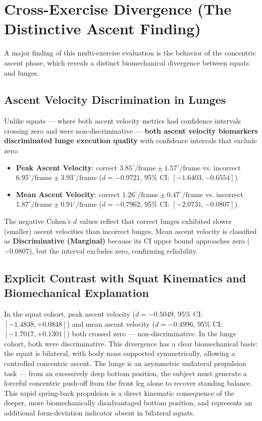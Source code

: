 \section{Cross-Exercise Divergence (The Distinctive Ascent Finding)}
\label{sec:5-3-cross-exercise-divergence-the-distinctive-ascent-finding}


A major finding of this multi-exercise evaluation is the behavior of the concentric ascent phase, which reveals a distinct biomechanical divergence between squats and lunges.

\subsection{Ascent Velocity Discrimination in Lunges}
\label{sec:5-3-1-ascent-velocity-discrimination-in-lunges}

Unlike squats — where both ascent velocity metrics had confidence intervals crossing zero and were non-discriminative — \textbf{both ascent velocity biomarkers discriminated lunge execution quality} with confidence intervals that exclude zero:
\begin{itemize}
  \item \textbf{Peak Ascent Velocity}: correct $3.85^\circ/\text{frame} \pm 1.57^\circ/\text{frame}$ vs. incorrect $6.95^\circ/\text{frame} \pm 3.93^\circ/\text{frame}$ ($d = -0.9721$, 95\% CI: $[-1.6403, -0.6554]$).
  \item \textbf{Mean Ascent Velocity}: correct $1.26^\circ/\text{frame} \pm 0.47^\circ/\text{frame}$ vs. incorrect $1.87^\circ/\text{frame} \pm 0.91^\circ/\text{frame}$ ($d = -0.7962$, 95\% CI: $[-2.0731, -0.0807]$).
\end{itemize}

The negative Cohen's $d$ values reflect that correct lunges exhibited slower (smaller) ascent velocities than incorrect lunges. Mean ascent velocity is classified as \textbf{Discriminative (Marginal)} because its CI upper bound approaches zero ($-0.0807$), but the interval excludes zero, confirming reliability.

\subsection{Explicit Contrast with Squat Kinematics and Biomechanical Explanation}
\label{sec:5-3-2-explicit-contrast-with-squat-kinematics-and-biomechanical-explanation}

In the squat cohort, peak ascent velocity ($d = -0.5049$, 95\% CI: $[-1.4838, +0.0848]$) and mean ascent velocity ($d = -0.4996$, 95\% CI: $[-1.7017, +0.1301]$) both crossed zero — non-discriminative. In the lunge cohort, both were discriminative. This divergence has a clear biomechanical basis: the squat is bilateral, with body mass supported symmetrically, allowing a controlled concentric ascent. The lunge is an asymmetric unilateral propulsion task — from an excessively deep bottom position, the subject must generate a forceful concentric push-off from the front leg alone to recover standing balance. This rapid spring-back propulsion is a direct kinematic consequence of the deeper, more biomechanically disadvantaged bottom position, and represents an additional form-deviation indicator absent in bilateral squats.

